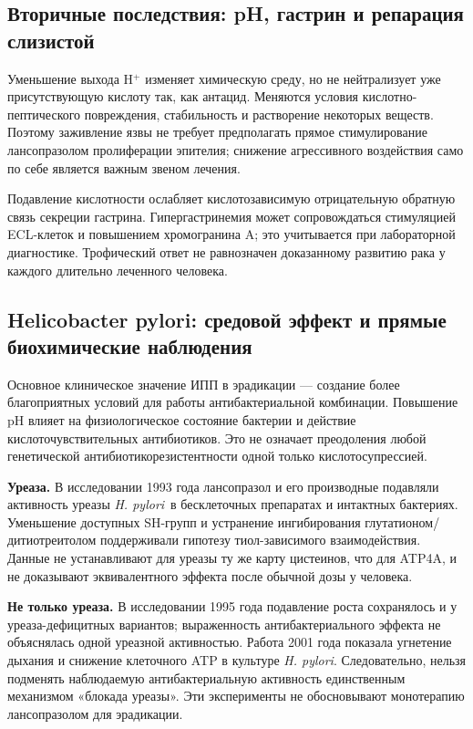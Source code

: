 \documentclass[11pt,a4paper,notitlepage]{report}
\newcommand{\Hp}{\textit{H. pylori}}
\newcommand{\src}[1]{\unskip\space\cite{#1}}
\begin{document}
\subsection{Вторичные последствия: pH, гастрин и репарация слизистой}
Уменьшение выхода H$^+$ изменяет химическую среду, но не нейтрализует уже присутствующую кислоту так, как антацид. Меняются условия кислотно-пептического повреждения, стабильность и растворение некоторых веществ. Поэтому заживление язвы не требует предполагать прямое стимулирование лансопразолом пролиферации эпителия; снижение агрессивного воздействия само по себе является важным звеном лечения.\src{pharmalabel,nice}

Подавление кислотности ослабляет кислотозависимую отрицательную обратную связь секреции гастрина. Гипергастринемия может сопровождаться стимуляцией ECL-клеток и повышением хромогранина A; это учитывается при лабораторной диагностике. Трофический ответ не равнозначен доказанному развитию рака у каждого длительно леченного человека.\src{uslabel}

\subsection{Helicobacter pylori: средовой эффект и прямые биохимические наблюдения}
Основное клиническое значение ИПП в эрадикации --- создание более благоприятных условий для работы антибактериальной комбинации. Повышение pH влияет на физиологическое состояние бактерии и действие кислоточувствительных антибиотиков. Это не означает преодоления любой генетической антибиотикорезистентности одной только кислотосупрессией.\src{maastricht,acghp}

\textbf{Уреаза.} В исследовании 1993 года лансопразол и его производные подавляли активность уреазы \Hp\ в бесклеточных препаратах и интактных бактериях. Уменьшение доступных SH-групп и устранение ингибирования глутатионом/дитиотреитолом поддерживали гипотезу тиол-зависимого взаимодействия. Данные не устанавливают для уреазы ту же карту цистеинов, что для ATP4A, и не доказывают эквивалентного эффекта после обычной дозы у человека.\src{molurease}

\textbf{Не только уреаза.} В исследовании 1995 года подавление роста сохранялось и у уреаза-дефицитных вариантов; выраженность антибактериального эффекта не объяснялась одной уреазной активностью. Работа 2001 года показала угнетение дыхания и снижение клеточного ATP в культуре \Hp. Следовательно, нельзя подменять наблюдаемую антибактериальную активность единственным механизмом «блокада уреазы». Эти эксперименты не обосновывают монотерапию лансопразолом для эрадикации.\src{molgrowth,molresp,acghp}
\end{document}
